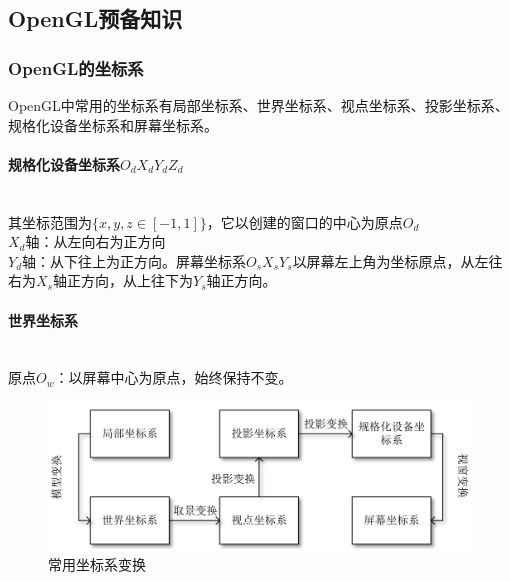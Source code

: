 \documentclass[10pt]{article}
\begin{document}
\subsection{OpenGL预备知识}
\subsubsection{OpenGL的坐标系}
OpenGL中常用的坐标系有局部坐标系、世界坐标系、视点坐标系、投影坐标系、规格化设备坐标系和屏幕坐标系。\\
\paragraph{规格化设备坐标系$O_dX_dY_dZ_d$} \mbox{}\\
其坐标范围为$\{x,y,z \in [-1,1]\}$，它以创建的窗口的中心为原点$O_d$\\
$X_d$轴：从左向右为正方向\\
$Y_d$轴：从下往上为正方向。屏幕坐标系$O_sX_sY_s$以屏幕左上角为坐标原点，从左往右为$X_s$轴正方向，从上往下为$Y_s$轴正方向。
\paragraph{世界坐标系} \mbox{}\\
原点$O_w$：以屏幕中心为原点，始终保持不变。
\begin{figure}[H]
\setlength{\abovecaptionskip}{2pt}
\setlength{\belowcaptionskip}{20pt}
\begin{center}
\includegraphics[scale=0.5]{coordinate.png}
\caption{常用坐标系变换}
\end{center}
\end{figure}
\end{document}
